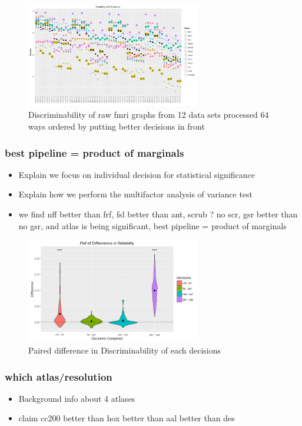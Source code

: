 \documentclass{article}
\begin{document}
\begin{figure}[t!]
\includegraphics[width=3.0in]{../Figs/64_pipelines_size.png}
\caption{Discriminability of raw fmri graphs from 12 data sets processed 64 ways ordered by putting better decisions in front}
\label{fig:6}
\end{figure}


\subsubsection{best pipeline = product of marginals}
\begin{itemize}
	\item Explain we focus on individual decision for statistical significance
	\item Explain how we perform the multifactor analysis of variance test
	\item we find nff better than frf, fsl better than ant, scrub ? no scr, gsr better than no gsr, and atlas is being significant, best pipeline = product of marginals
\end{itemize}

\begin{figure}[t!]
\includegraphics[width=3.0in]{../Figs/Differ_violin_mean.png}
\caption{Paired difference in Discriminability of each decisions}
\label{fig:7}
\end{figure}

\subsubsection{which atlas/resolution}
\begin{itemize}
	\item Background info about 4 atlases
	\item claim cc200 better than hox  better than aal better than des
\end{itemize}
\end{document}
